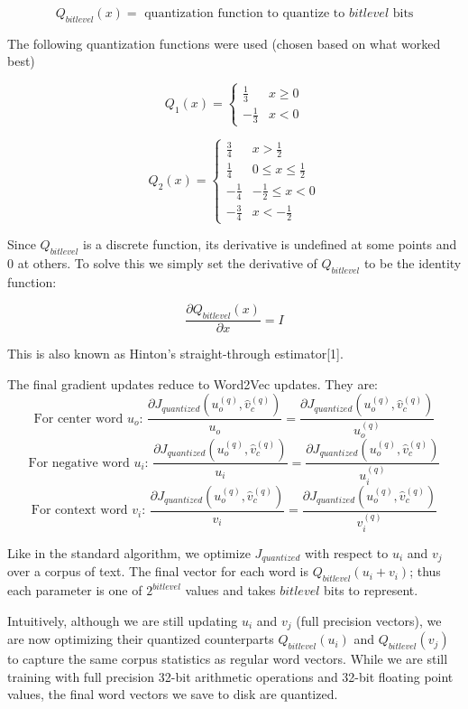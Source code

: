 \documentclass{article} %
\begin{document}
$$
Q_{bitlevel}(x) = \mbox{ quantization function to quantize to } bitlevel \mbox{ bits}
$$

The following quantization functions were used (chosen based on what worked best)

\[
Q_1(x) =
\begin{cases}
  \frac{1}{3} & x \geq 0\\
  -\frac{1}{3} & x < 0
\end{cases}
\]


\[
Q_2(x) =
\begin{cases}
  \frac{3}{4} & x > \frac{1}{2}\\
  \frac{1}{4} & 0 \leq x \leq \frac{1}{2}\\
  -\frac{1}{4} & -\frac{1}{2} \leq x < 0\\
  -\frac{3}{4} & x < -\frac{1}{2}
\end{cases}
\]

Since $Q_{bitlevel}$ is a discrete function, its derivative is
undefined at some points and 0 at others. To solve this we simply set
the derivative of $Q_{bitlevel}$ to be the identity function:

$$
\frac{\partial Q_{bitlevel}(x)}{\partial x} = I
$$

This is also known as Hinton's straight-through estimator[1].

The final gradient updates reduce to Word2Vec updates. They are:
$$
\mbox{For center word } u_o \textbf{: } \frac{\partial J_{quantized} (u^{(q)}_o, \hat{v}^{(q)}_c)}{u_o} = \frac{\partial J_{quantized} (u^{(q)}_o, \hat{v}^{(q)}_c)}{u^{(q)}_o}
$$
$$
\mbox{For negative word } u_i \textbf{: } \frac{\partial J_{quantized} (u^{(q)}_o, \hat{v}^{(q)}_c)}{u_i} = \frac{\partial J_{quantized} (u^{(q)}_o, \hat{v}^{(q)}_c)}{u^{(q)}_i}
$$
$$
\mbox{For context word } v_i \textbf{: } \frac{\partial J_{quantized} (u^{(q)}_o, \hat{v}^{(q)}_c)}{v_i} = \frac{\partial J_{quantized} (u^{(q)}_o, \hat{v}^{(q)}_c)}{v^{(q)}_i}
$$

Like in the standard algorithm, we optimize $J_{quantized}$ with
respect to $u_i$ and $v_j$ over a corpus of text. The final vector for
each word is $Q_{bitlevel}(u_i + v_i)$; thus each parameter is one of
$2^{bitlevel}$ values and takes $bitlevel$ bits to represent.

Intuitively, although we are still updating $u_i$ and $v_j$ (full
precision vectors), we are now optimizing their quantized
counterparts $Q_{bitlevel}(u_i)$ and $Q_{bitlevel}(v_j)$ to capture
the same corpus statistics as regular word vectors. While we are still
training with full precision 32-bit arithmetic operations and 32-bit floating
point values, the final word vectors we save to disk are
quantized.
\end{document}
